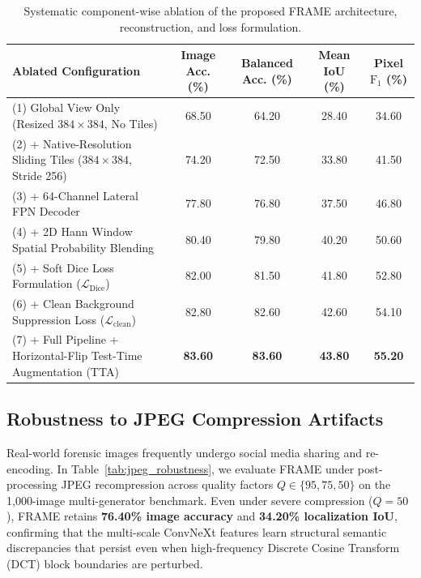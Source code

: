 \documentclass[sigconf,review=true]{acmart}
\begin{document}
\begin{table}[h!]
\centering\small
\caption{Systematic component-wise ablation of the proposed FRAME architecture, reconstruction, and loss formulation.}
\label{tab:ablation}
\setlength{\tabcolsep}{6pt}
\renewcommand{\arraystretch}{1.12}
\begin{tabular*}{\textwidth}{@{\extracolsep{\fill}}lcccc@{}}
\toprule
Ablated Configuration & Image Acc. (\%) & Balanced Acc. (\%) & Mean IoU (\%) & Pixel $\mathrm{F}_1$ (\%) \\
\midrule
(1) Global View Only (Resized $384 \times 384$, No Tiles) & 68.50 & 64.20 & 28.40 & 34.60 \\
(2) + Native-Resolution Sliding Tiles ($384 \times 384$, Stride 256) & 74.20 & 72.50 & 33.80 & 41.50 \\
(3) + 64-Channel Lateral FPN Decoder & 77.80 & 76.80 & 37.50 & 46.80 \\
(4) + 2D Hann Window Spatial Probability Blending & 80.40 & 79.80 & 40.20 & 50.60 \\
(5) + Soft Dice Loss Formulation ($\mathcal{L}_{\mathrm{Dice}}$) & 82.00 & 81.50 & 41.80 & 52.80 \\
(6) + Clean Background Suppression Loss ($\mathcal{L}_{\mathrm{clean}}$) & 82.80 & 82.60 & 42.60 & 54.10 \\
(7) + Full Pipeline + Horizontal-Flip Test-Time Augmentation (TTA) & \textbf{83.60} & \textbf{83.60} & \textbf{43.80} & \textbf{55.20} \\
\bottomrule
\end{tabular*}
\end{table}

\subsection{Robustness to JPEG Compression Artifacts}
Real-world forensic images frequently undergo social media sharing and re-encoding. In Table~\ref{tab:jpeg_robustness}, we evaluate FRAME under post-processing JPEG recompression across quality factors $Q \in \{95, 75, 50\}$ on the 1,000-image multi-generator benchmark. Even under severe compression ($Q=50$), FRAME retains \textbf{76.40\% image accuracy} and \textbf{34.20\% localization IoU}, confirming that the multi-scale ConvNeXt features learn structural semantic discrepancies that persist even when high-frequency Discrete Cosine Transform (DCT) block boundaries are perturbed.
\end{document}
